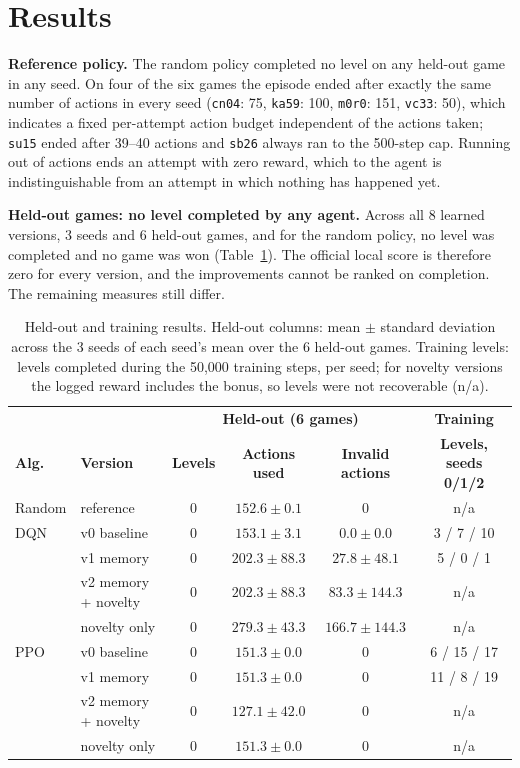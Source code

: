 \documentclass[10pt]{article}
\begin{document}
\section{Results}
\label{sec:results}

\textbf{Reference policy.} The random policy completed no level on any held-out game in any seed. On four of the six games the episode ended after exactly the same number of actions in every seed (\texttt{cn04}: 75, \texttt{ka59}: 100, \texttt{m0r0}: 151, \texttt{vc33}: 50), which indicates a fixed per-attempt action budget independent of the actions taken; \texttt{su15} ended after 39--40 actions and \texttt{sb26} always ran to the 500-step cap. Running out of actions ends an attempt with zero reward, which to the agent is indistinguishable from an attempt in which nothing has happened yet.

\textbf{Held-out games: no level completed by any agent.} Across all 8 learned versions, 3 seeds and 6 held-out games, and for the random policy, no level was completed and no game was won (Table~\ref{tab:results}). The official local score is therefore zero for every version, and the improvements cannot be ranked on completion. The remaining measures still differ.

\begin{table}[t]
\caption{Held-out and training results. Held-out columns: mean $\pm$ standard deviation across the 3 seeds of each seed's mean over the 6 held-out games. Training levels: levels completed during the 50,000 training steps, per seed; for novelty versions the logged reward includes the bonus, so levels were not recoverable (n/a).}
\label{tab:results}
\begin{center}
\small
\begin{tabular}{llcccc}
\toprule
 & & \multicolumn{3}{c}{\textbf{Held-out (6 games)}} & \textbf{Training} \\
\textbf{Alg.} & \textbf{Version} & \textbf{Levels} & \textbf{Actions used} & \textbf{Invalid actions} & \textbf{Levels, seeds 0/1/2} \\
\midrule
Random & reference & 0 & $152.6 \pm 0.1$ & 0 & n/a \\
\midrule
DQN & v0 baseline & 0 & $153.1 \pm 3.1$ & $0.0 \pm 0.0$ & 3 / 7 / 10 \\
 & v1 memory & 0 & $202.3 \pm 88.3$ & $27.8 \pm 48.1$ & 5 / 0 / 1 \\
 & v2 memory + novelty & 0 & $202.3 \pm 88.3$ & $83.3 \pm 144.3$ & n/a \\
 & novelty only & 0 & $279.3 \pm 43.3$ & $166.7 \pm 144.3$ & n/a \\
\midrule
PPO & v0 baseline & 0 & $151.3 \pm 0.0$ & 0 & 6 / 15 / 17 \\
 & v1 memory & 0 & $151.3 \pm 0.0$ & 0 & 11 / 8 / 19 \\
 & v2 memory + novelty & 0 & $127.1 \pm 42.0$ & 0 & n/a \\
 & novelty only & 0 & $151.3 \pm 0.0$ & 0 & n/a \\
\bottomrule
\end{tabular}
\end{center}
\end{table}
\end{document}
